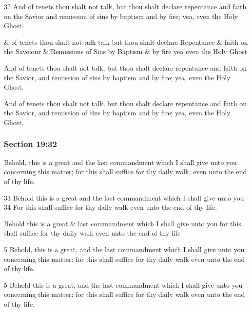 		\begin{framed}
		\scriptsize
			\begin{compactdesc}
				\item[JSP] 32 And of tenets thou shalt not talk, but thou shalt declare repentance and faith on the Savior and remission of sins by baptism and by fire; yea, even the Holy Ghost.
				\item[RB1] \& of tenets thou shalt not \sout{talk} talk but thou shalt declare Repentance \& faith on the Saveiour \& Remissions of Sins by Baptism \& by fire yea even the Holy Ghost
				\item[DC 1835] And of tenets thou shalt not talk, but thou shalt declare repentance and faith on the Savior, and remission of sins by baptism and by fire; yea, even the Holy Ghost.
				\item[DC 1844] And of tenets thou shalt not talk, but thou shalt declare repentance and faith on the Savior, and remission of sins by baptism and by fire; yea, even the Holy Ghost.
			\end{compactdesc}
		\end{framed}

	\subsubsection{Section 19:32} %
		\label{DC19-32}

		Behold, this is a great and the last commandment which I shall give unto you concerning this matter; for this shall suffice for thy daily walk, even unto the end of thy life.

		\begin{framed}
		\scriptsize
			\begin{compactdesc}
				\item[JSP] 33 Behold this is a great and the last commandment which I shall give unto you: 34 For this shall suffice for thy daily walk even unto the end of thy life.
				\item[RB1] Behold this is a great \& last commandment which I shall give unto you for this shall suffice for thy daily walk even unto the end of thy life
				\item[DC 1835] 5 Behold, this is a great, and the last commandment which I shall give unto you concerning this matter: for this shall suffice for thy daily walk even unto the end of thy life. 
				\item[DC 1844] 5 Behold this is a great, and the last commandment which I shall give unto you concerning this matter: for this shall suffice for thy daily walk even unto the end of thy life. 
			\end{compactdesc}
		\end{framed}

